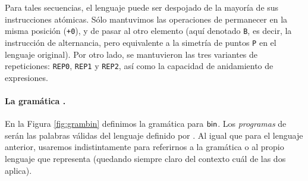 Para tales secuencias, el lenguaje puede ser despojado de la mayoría de sus instrucciones atómicas. Sólo mantuvimos las operaciones de permanecer en la misma posición (\verb#+0#), y de pasar al otro elemento (aquí denotado \verb#B#, es decir, la instrucción de alternancia, pero equivalente a la simetría de puntos \verb#P# en el lenguaje original). Por otro lado, se mantuvieron las tres variantes de repeticiones: \verb#REP0#, \verb#REP1# y \verb#REP2#, así como la capacidad de anidamiento de expresiones. 

\paragraph{La gramática \grambin.}
En la Figura \ref{fig:grambin} definimos la gramática para ${\sf bin}$. Los {\em programas} de \grambin serán las palabras válidas del lenguaje definido por \grambin. Al igual que para el lenguaje anterior, usaremos indistintamente \grambin para referirnos a la gramática o al propio lenguaje que representa (quedando siempre claro del contexto cuál de las dos aplica).

